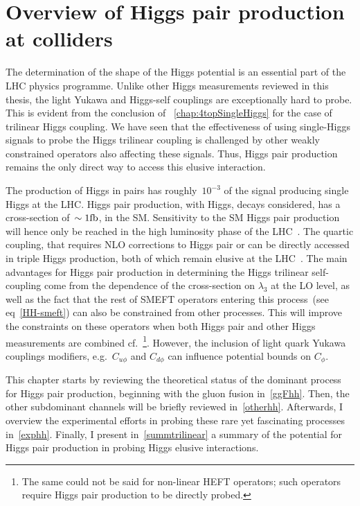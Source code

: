 
\chapter{ Overview of Higgs pair production at colliders }\label{chap:overviewDiHiggs}
\par The determination of the shape of the Higgs potential is an essential part of the LHC physics programme. Unlike other Higgs measurements reviewed in this thesis, the light Yukawa and Higgs-self couplings are exceptionally hard to probe.  This is evident from the conclusion of ~\autoref{chap:4topSingleHiggs} for the case of trilinear Higgs coupling. We have seen that the effectiveness of using single-Higgs signals to probe the Higgs trilinear coupling is challenged by other weakly constrained operators also affecting these signals. Thus, Higgs pair production remains the only direct way to access this elusive interaction. 
\par The production of Higgs in pairs has roughly~$ 10^{-3} $ of the signal producing single Higgs at the LHC. Higgs pair production, with Higgs, decays considered, has a cross-section of~$ \sim 1 \si{\femtobarn}$, in the SM. Sensitivity to the SM Higgs pair production will hence only be reached in the high luminosity phase of the LHC~\cite{Cepeda:2019klc}. The quartic coupling, that requires NLO corrections to Higgs pair or can be directly accessed in triple Higgs production, both of which remain elusive at the LHC~\cite{Plehn:2005nk}. The main advantages for Higgs pair production in determining the Higgs trilinear self-coupling come from the dependence of the cross-section on $\lambda_3$ at the LO level, as well as the fact that the rest of SMEFT operators entering this process~(see eq~\eqref{HH-smeft}) can also be constrained from other processes. This will improve the constraints on these operators when both Higgs pair and other Higgs measurements are combined cf.~\cite{DiVita:2017eyz}\footnote{The same could not be said for non-linear HEFT operators; such operators require Higgs pair production to be directly probed.}. However, the inclusion of light quark Yukawa couplings modifiers, e.g.~$ C_{u\phi}$ and $C_{d \phi}$ can influence potential bounds on $C_\phi$. 
\par This chapter starts by reviewing the theoretical status of the dominant process for Higgs pair production, beginning with the gluon fusion in~\autoref{ggFhh}. Then, the other subdominant channels will be briefly reviewed in~\autoref{otherhh}.  Afterwards, I overview the experimental efforts in probing these rare yet fascinating processes in~\autoref{exphh}. Finally, I present  in~\autoref{summtrilinear} a summary of the potential for Higgs pair production in probing Higgs elusive interactions.
